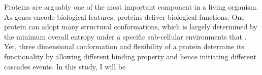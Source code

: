 Proteins are arguably one of the most important component in a living organism. As genes encode biological features, proteins deliver biological functions. One protein can adopt many structural conformations, which is largely determined by the minimum overall entropy under a specific  sub-cellular environments that . Yet, three dimensional conformation and flexibility of a protein determine its functionality by allowing different binding property and hence initiating different cascades events. In this study, I will be 